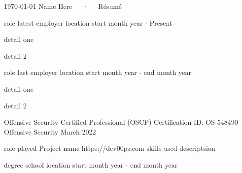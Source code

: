 \documentclass[11pt, letterpaper]{awesome-cv}
\begin{document}
\makecvheader[C]

\makecvfooter
  {\today}
  {Name Here~~~·~~~Résumé}
  {\thepage}

\begin{cvparagraph}



\end{cvparagraph}

\begin{cventries}


  \cventry
    {role}
    {latest employer}
    {location}
    {start month year - Present}
    {
      \begin{cvitems}
        \item{detail one}
        \item{detail 2}
      \end{cvitems}
    }


  \cventry
    {role}
    {last employer}
    {location}
    {start month year - end month year}
    {
      \begin{cvitems}
        \item{detail one}
        \item{detail 2}
      \end{cvitems}
    }



\end{cventries}

\begin{cvhonors}

  \cvhonor
    {Offensive Security Certified Professional (OSCP)}
    {Certification ID: OS-548490}
    {Offensive Security}
    {March 2022}


\end{cvhonors}

\begin{cventries}

  \cventry
    {role played}
    {Project name}
    {https://dev00ps.com}
    {skills used}
    {descriptsion}


\end{cventries}

\begin{cventries}

  \cventry
    {degree}
    {school}
    {location}
    {start month year - end month year}
    {
    }


\end{cventries}

\end{document}
